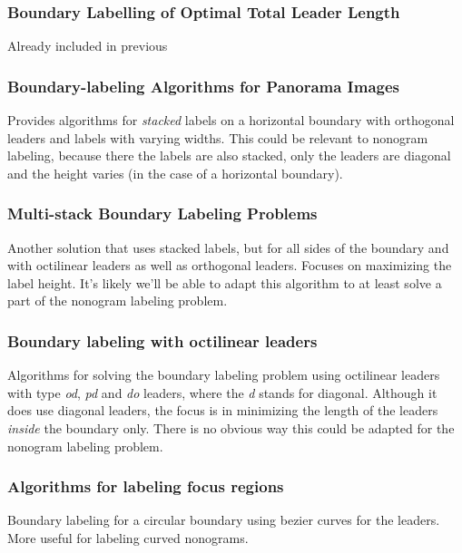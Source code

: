 \documentclass[a4paper]{article}
\begin{document}
\subsubsection{Boundary Labelling of Optimal Total Leader Length \cite{boundaryLabelling}}
Already included in previous\\

\subsubsection{Boundary-labeling Algorithms for Panorama Images \cite{Gemsa:2011:BAP:2093973.2094012}}
Provides algorithms for \emph{stacked} labels on a horizontal boundary with orthogonal leaders and labels with varying widths. This could be relevant to nonogram labeling, because there the labels are also stacked, only the leaders are diagonal and the height varies (in the case of a horizontal boundary).\\


\subsubsection{Multi-stack Boundary Labeling Problems \cite{bekos2006multi}}
Another solution that uses stacked labels, but for all sides of the boundary and with octilinear leaders as well as orthogonal leaders. Focuses on maximizing the label height. It's likely we'll be able to adapt this algorithm to at least solve a part of the nonogram labeling problem. 


\subsubsection{Boundary labeling with octilinear leaders \cite{bekos2010boundary}}
Algorithms for solving the boundary labeling problem using octilinear leaders with type \emph{od}, \emph{pd} and \emph{do} leaders, where the \emph{d} stands for diagonal. Although it does use diagonal leaders, the focus is in minimizing the length of the leaders \emph{inside} the boundary only. There is no obvious way this could be adapted for the nonogram labeling problem.

\subsubsection{Algorithms for labeling focus regions \cite{fink2012algorithms}}
Boundary labeling for a circular boundary using bezier curves for the leaders. More useful for labeling curved nonograms.
\end{document}
